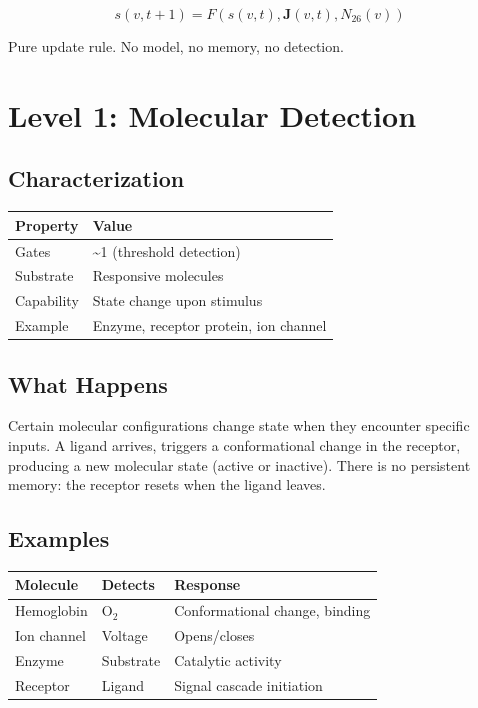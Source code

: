 \documentclass[
  11pt,
  letterpaper,
  twoside,
  openright]{book}
\begin{document}
\[s(v, t+1) = F(s(v,t), \mathbf{J}(v,t), N_{26}(v))\]

Pure update rule. No model, no memory, no detection.

\section{Level 1: Molecular
Detection}\label{level-1-molecular-detection}

\subsection{Characterization}\label{characterization-1}

\begin{longtable}[]{@{}ll@{}}
\toprule\noalign{}
Property & Value \\
\midrule\noalign{}
\endhead
\bottomrule\noalign{}
\endlastfoot
Gates & \textasciitilde1 (threshold detection) \\
Substrate & Responsive molecules \\
Capability & State change upon stimulus \\
Example & Enzyme, receptor protein, ion channel \\
\end{longtable}

\subsection{What Happens}\label{what-happens-1}

Certain molecular configurations change state when they encounter
specific inputs. A ligand arrives, triggers a conformational change in
the receptor, producing a new molecular state (active or inactive).
There is no persistent memory: the receptor resets when the ligand
leaves.

\subsection{Examples}\label{examples-5}

\begin{longtable}[]{@{}lll@{}}
\toprule\noalign{}
Molecule & Detects & Response \\
\midrule\noalign{}
\endhead
\bottomrule\noalign{}
\endlastfoot
Hemoglobin & \(\text{O}_2\) & Conformational change, binding \\
Ion channel & Voltage & Opens/closes \\
Enzyme & Substrate & Catalytic activity \\
Receptor & Ligand & Signal cascade initiation \\
\end{longtable}
\end{document}
